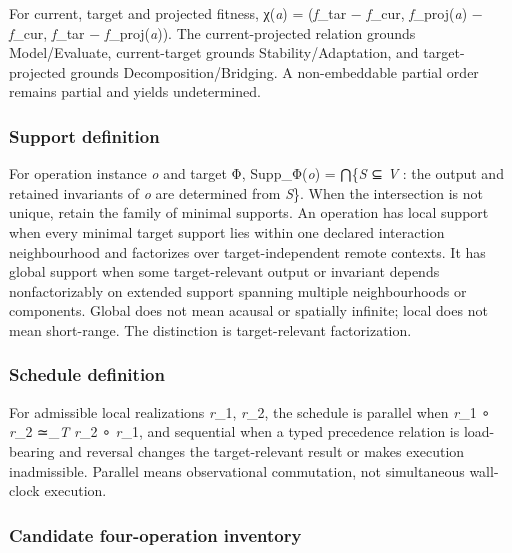 For current, target and projected fitness, χ(\emph{a}) = (\emph{f}\_tar
− \emph{f}\_cur, \emph{f}\_proj(\emph{a}) − \emph{f}\_cur, \emph{f}\_tar
− \emph{f}\_proj(\emph{a})). The current-projected relation grounds
Model/Evaluate, current-target grounds Stability/Adaptation, and
target-projected grounds Decomposition/Bridging. A non-embeddable
partial order remains partial and yields undetermined.

\hypertarget{support-definition}{%
\subsubsection{Support definition}\label{support-definition}}

For operation instance \emph{o} and target Φ, Supp\_Φ(\emph{o}) =
⋂\{\emph{S} ⊆ \emph{V} : the output and retained invariants of \emph{o}
are determined from \emph{S}\}. When the intersection is not unique,
retain the family of minimal supports. An operation has local support
when every minimal target support lies within one declared interaction
neighbourhood and factorizes over target-independent remote contexts. It
has global support when some target-relevant output or invariant depends
nonfactorizably on extended support spanning multiple neighbourhoods or
components. Global does not mean acausal or spatially infinite; local
does not mean short-range. The distinction is target-relevant
factorization.

\hypertarget{schedule-definition}{%
\subsubsection{Schedule definition}\label{schedule-definition}}

For admissible local realizations \emph{r}\_1, \emph{r}\_2, the schedule
is parallel when \emph{r}\_1 ∘ \emph{r}\_2 ≃\_\emph{T} \emph{r}\_2 ∘
\emph{r}\_1, and sequential when a typed precedence relation is
load-bearing and reversal changes the target-relevant result or makes
execution inadmissible. Parallel means observational commutation, not
simultaneous wall-clock execution.

\hypertarget{candidate-four-operation-inventory}{%
\subsubsection{Candidate four-operation
inventory}\label{candidate-four-operation-inventory}}

